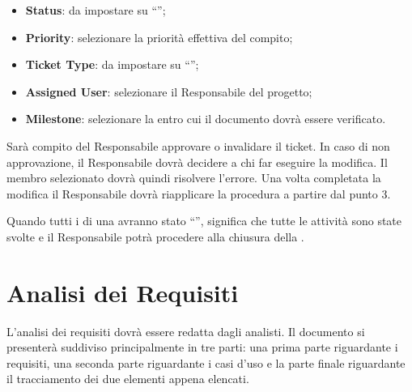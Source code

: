 \begin{enumerate}
\begin{itemize}
\item \textbf{Status}: da impostare su ``'';
\item \textbf{Priority}: selezionare la priorità effettiva del compito;
\item \textbf{Ticket Type}: da impostare su ``'';
\item \textbf{Assigned User}: selezionare il Responsabile del progetto;
\item \textbf{Milestone}: selezionare la  entro cui il documento dovrà essere verificato.
\end{itemize}
Sarà  compito del Responsabile approvare o invalidare il ticket. In caso di non approvazione, il Responsabile dovrà decidere a chi far eseguire la modifica. Il membro selezionato dovrà quindi risolvere l'errore. Una volta completata la modifica il Responsabile dovrà riapplicare la procedura a partire dal punto 3.
\end{enumerate}
Quando tutti i  di una  avranno stato ``'', significa che tutte le attività sono state svolte e il Responsabile potrà procedere alla chiusura della .

\clearpage
\section{Analisi dei Requisiti}
L'analisi dei requisiti dovrà essere redatta dagli analisti. Il documento si presenterà suddiviso principalmente in tre parti: una prima parte riguardante i requisiti, una seconda parte riguardante i casi d'uso e la parte finale riguardante il tracciamento dei due elementi appena elencati.

